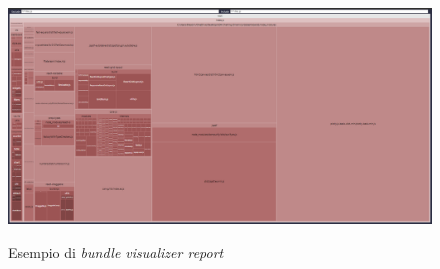\begin{figure}[H]
    \centering
    \includegraphics[alt={Esempio di bundle visualizer report}, width=1 \columnwidth]{img/bundle-visualizer.png}
    \caption{Esempio di \textit{bundle visualizer report}}
    \label{fig:bundle-visualizer}
\end{figure}

